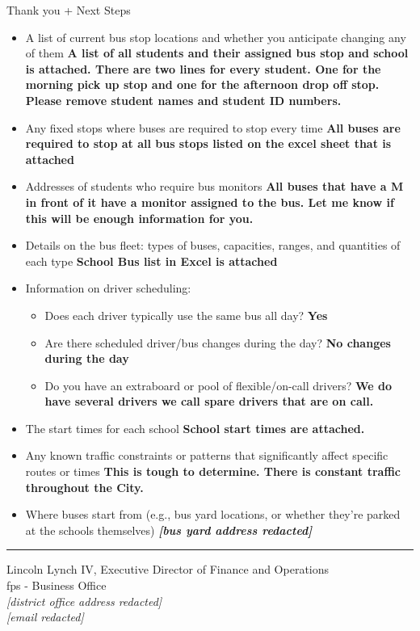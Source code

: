{\begin{emailbox}{Thank you + Next Steps}
    \begin{itemize}
        \item A list of current bus stop locations and whether you anticipate changing any of them \textbf{A list of all students and their assigned bus stop and school is attached. There are two lines for every student. One for the morning pick up stop and one for the afternoon drop off stop. Please remove student names and student ID numbers.}
        \item Any fixed stops where buses are required to stop every time \textbf{All buses are required to stop at all bus stops listed on the excel sheet that is attached}
        \item Addresses of students who require bus monitors \textbf{All buses that have a M in front of it have a monitor assigned to the bus. Let me know if this will be enough information for you.}
        \item Details on the bus fleet: types of buses, capacities, ranges, and quantities of each type \textbf{School Bus list in Excel is attached}
        \item Information on driver scheduling:
        \begin{itemize}
            \item Does each driver typically use the same bus all day? \textbf{Yes}
            \item Are there scheduled driver/bus changes during the day?\textbf{ No changes during the day}
            \item Do you have an extraboard or pool of flexible/on-call drivers? \textbf{We do have several drivers we call spare drivers that are on call.}
        \end{itemize}
        \item The start times for each school \textbf{School start times are attached.} 
        \item Any known traffic constraints or patterns that significantly affect specific routes or times \textbf{This is tough to determine. There is constant traffic throughout the City.}
        \item Where buses start from (e.g., bus yard locations, or whether they're parked at the schools themselves) \textbf{\textit{[bus yard address redacted]}}
    \end{itemize}

    \noindent\rule{\textwidth}{1pt}

    Lincoln Lynch IV, Executive Director of Finance and Operations \\
    \Acrlong{fps} - Business Office \\
    \textit{[district office address redacted]} \\
    \textit{[email redacted]} \vspace{1em}


\end{emailbox}}
